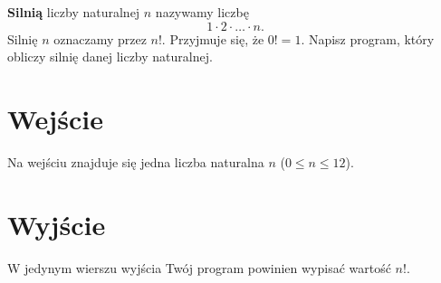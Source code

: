 \documentclass{spiral-kurs}
\begin{document}
\makeheader
%
    \textbf{Silnią} liczby naturalnej $n$ nazywamy liczbę
    $$1 \cdot 2 \cdot \ldots \cdot n.$$
    Silnię $n$ oznaczamy przez $n!$.
    Przyjmuje się, że $0!=1$.
    Napisz program, który obliczy silnię danej liczby naturalnej.

    \section{Wejście}
    Na wejściu znajduje się jedna liczba naturalna $n$ ($0 \le n \le 12$).
  
    \section{Wyjście}
    W jedynym wierszu wyjścia Twój program powinien wypisać wartość $n!$.
                                  


  
\end{document}
